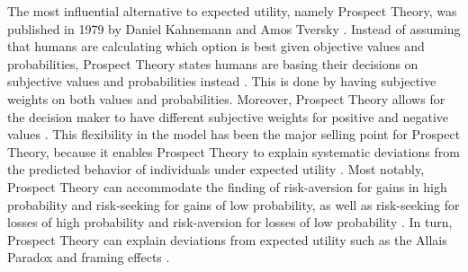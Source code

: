 \documentclass{article}
\begin{document}
The most influential alternative to expected utility, namely Prospect Theory, was published in 1979 by Daniel Kahnemann and Amos Tversky \cite{kahneman1979e}. Instead of assuming that humans are calculating which option is best given objective values and probabilities, Prospect Theory states humans are basing their decisions on subjective values and probabilities instead \cite{kahneman1979e}. This is done by having subjective weights on both values and probabilities. Moreover, Prospect Theory allows for the decision maker to have different subjective weights for positive and negative values \cite{nilsson2011jomp}.
This flexibility in the model has been the major selling point for Prospect Theory, because it enables Prospect Theory to explain systematic deviations from the predicted behavior of individuals under expected utility \cite{nilsson2011jomp}. Most notably, Prospect Theory can accommodate the finding of risk-aversion for gains in high probability and risk-seeking for gains of low probability, as well as risk-seeking for losses of high probability and risk-aversion for losses of low probability \cite{nilsson2011jomp}. In turn, Prospect Theory can explain deviations from expected utility such as the Allais Paradox and framing effects \cite{fennema1997original}.
\end{document}
